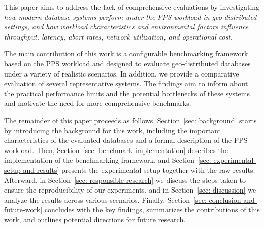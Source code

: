 This paper aims to address the lack of comprehensive evaluations by investigating \textit{how modern database systems perform under the PPS workload in geo-distributed settings, and how workload characteristics and environmental factors influence throughput, latency, abort rates, network utilization, and operational cost}.

The main contribution of this work is a configurable benchmarking framework based on the PPS workload and designed to evaluate geo-distributed databases under a variety of realistic scenarios. In addition, we provide a comparative evaluation of several representative systems. The findings aim to inform about the practical performance limits and the potential bottlenecks of these systems and motivate the need for more comprehensive benchmarks.

The remainder of this paper proceeds as follows. Section~\ref{sec: background} starts by introducing the background for this work, including the important characteristics of the evaluated databases and a formal description of the PPS workload. Then, Section~\ref{sec: benchmark-implementation} describes the implementation of the benchmarking framework, and Section~\ref{sec: experimental-setup-and-results} presents the experimental setup together with the raw results. Afterward, in Section~\ref{sec: responsible-research} we discuss the steps taken to ensure the reproducibility of our experiments, and in Section~\ref{sec: discussion} we analyze the results across various scenarios. Finally, Section~\ref{sec: conclusion-and-future-work} concludes with the key findings, summarizes the contributions of this work, and outlines potential directions for future research.
